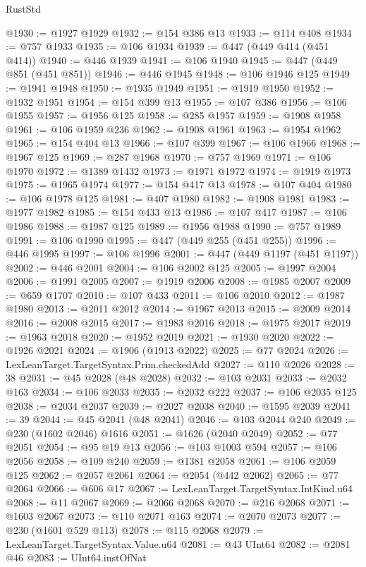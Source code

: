 \begin{lexlean}{RustStd}
\begin{coremodule}
@1930 := @1927 @1929
@1932 := @154 @386 @13
@1933 := @114 @408
@1934 := @757 @1933
@1935 := @106 @1934
@1939 := @447 (@449 @414 (@451 @414))
@1940 := @446 @1939
@1941 := @106 @1940
@1945 := @447 (@449 @851 (@451 @851))
@1946 := @446 @1945
@1948 := @106 @1946 @125
@1949 := @1941 @1948
@1950 := @1935 @1949
@1951 := @1919 @1950
@1952 := @1932 @1951
@1954 := @154 @399 @13
@1955 := @107 @386
@1956 := @106 @1955
@1957 := @1956 @125
@1958 := @285 @1957
@1959 := @1908 @1958
@1961 := @106 @1959 @236
@1962 := @1908 @1961
@1963 := @1954 @1962
@1965 := @154 @404 @13
@1966 := @107 @399
@1967 := @106 @1966
@1968 := @1967 @125
@1969 := @287 @1968
@1970 := @757 @1969
@1971 := @106 @1970
@1972 := @1389 @1432
@1973 := @1971 @1972
@1974 := @1919 @1973
@1975 := @1965 @1974
@1977 := @154 @417 @13
@1978 := @107 @404
@1980 := @106 @1978 @125
@1981 := @407 @1980
@1982 := @1908 @1981
@1983 := @1977 @1982
@1985 := @154 @433 @13
@1986 := @107 @417
@1987 := @106 @1986
@1988 := @1987 @125
@1989 := @1956 @1988
@1990 := @757 @1989
@1991 := @106 @1990
@1995 := @447 (@449 @255 (@451 @255))
@1996 := @446 @1995
@1997 := @106 @1996
@2001 := @447 (@449 @1197 (@451 @1197))
@2002 := @446 @2001
@2004 := @106 @2002 @125
@2005 := @1997 @2004
@2006 := @1991 @2005
@2007 := @1919 @2006
@2008 := @1985 @2007
@2009 := @659 @1707
@2010 := @107 @433
@2011 := @106 @2010
@2012 := @1987 @1980
@2013 := @2011 @2012
@2014 := @1967 @2013
@2015 := @2009 @2014
@2016 := @2008 @2015
@2017 := @1983 @2016
@2018 := @1975 @2017
@2019 := @1963 @2018
@2020 := @1952 @2019
@2021 := @1930 @2020
@2022 := @1926 @2021
@2024 := @1906 (@1913 @2022)
@2025 := @77 @2024
@2026 := LexLeanTarget.TargetSyntax.Prim.checkedAdd
@2027 := @110 @2026
@2028 := 38
@2031 := @45 @2028 (@48 @2028)
@2032 := @103 @2031
@2033 := @2032 @163
@2034 := @106 @2033
@2035 := @2032 @222
@2037 := @106 @2035 @125
@2038 := @2034 @2037
@2039 := @2027 @2038
@2040 := @1595 @2039
@2041 := 39
@2044 := @45 @2041 (@48 @2041)
@2046 := @103 @2044 @240
@2049 := @230 (@1602 @2046) @1616
@2051 := @1626 (@2040 @2049)
@2052 := @77 @2051
@2054 := @95 @19 @13
@2056 := @103 @1003 @594
@2057 := @106 @2056
@2058 := @109 @240
@2059 := @1381 @2058
@2061 := @106 @2059 @125
@2062 := @2057 @2061
@2064 := @2054 (@442 @2062)
@2065 := @77 @2064
@2066 := @606 @17
@2067 := LexLeanTarget.TargetSyntax.IntKind.u64
@2068 := @11 @2067
@2069 := @2066 @2068
@2070 := @216 @2068
@2071 := @1603 @2067
@2073 := @110 @2071 @163
@2074 := @2070 @2073
@2077 := @230 (@1601 @529 @113)
@2078 := @115 @2068
@2079 := LexLeanTarget.TargetSyntax.Value.u64
@2081 := @43 UInt64
@2082 := @2081 @46
@2083 := UInt64.instOfNat

\end{coremodule}
\end{lexlean}
